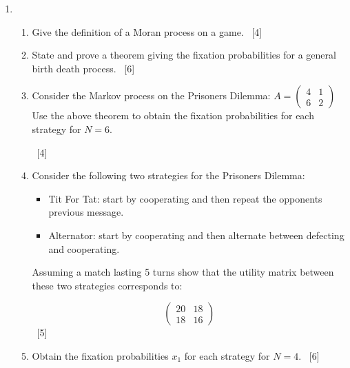 \documentclass[12pt,a4paper]{article}
\makeatletter
\renewcommand{\@oddfoot}{\hfil \arabic{page} \hfil}    %
\makeatother
\begin{document}
\begin{enumerate}
\newpage
\item

    \begin{enumerate}
        \item Give the definition of a Moran process on a game.
            ~\hfill{[4]}
        \item State and prove a theorem giving the fixation probabilities for a
            general birth death process.
            ~\hfill{[6]}
        \item Consider the Markov process on the Prisoners Dilemma:
        \(A = \begin{pmatrix} 4 & 1\\ 6 & 2 \end{pmatrix}\)
            Use the above theorem to obtain the fixation probabilities for each
            strategy for \(N=6\).

            ~\hfill{[4]}
        \item Consider the following two strategies for the Prisoners Dilemma:
            \begin{itemize}
                \item Tit For Tat: start by cooperating and then repeat the
                    opponents previous message.
                \item Alternator: start by cooperating and then alternate
                    between defecting and cooperating.
            \end{itemize}
            Assuming a match lasting 5 turns show that the utility matrix
            between these two strategies corresponds to:

            \[
                \begin{pmatrix}
                    20 & 18\\
                    18 & 16
                \end{pmatrix}
            \]
                ~\hfill{[5]}
            \item Obtain the fixation probabilities \(x_1\) for each strategy
                for \(N=4\).
          ~\hfill{[6]}
    \end{enumerate}
\end{enumerate}


\makeatletter
\renewcommand{\@oddfoot}{\hfil \arabic{page}X \hfil}    %
\makeatother
\end{document}
